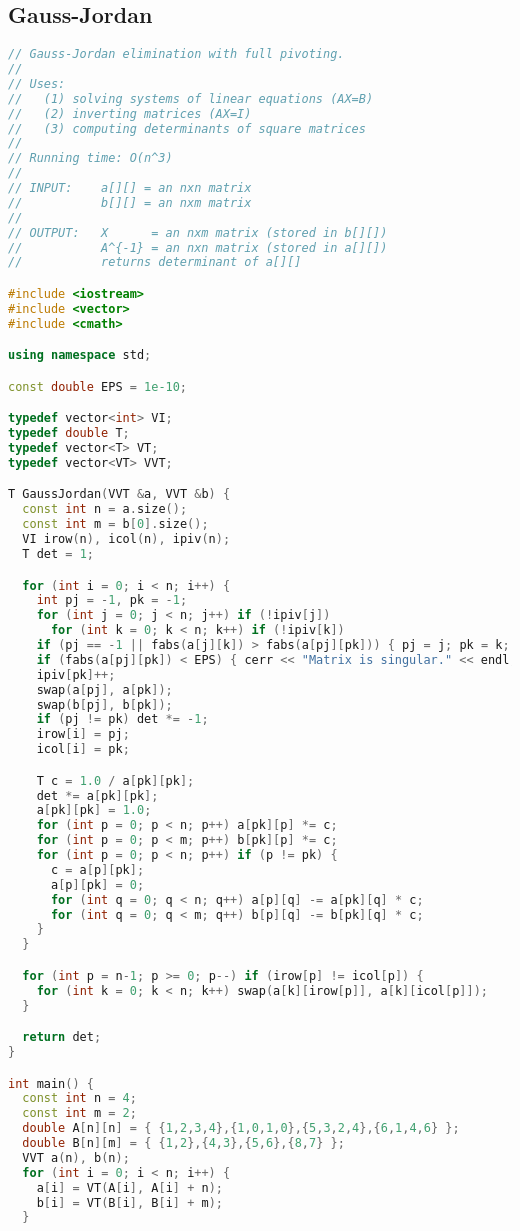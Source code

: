 \subsection{Gauss-Jordan}
\begin{lstlisting}[language=C++]
// Gauss-Jordan elimination with full pivoting.
//
// Uses:
//   (1) solving systems of linear equations (AX=B)
//   (2) inverting matrices (AX=I)
//   (3) computing determinants of square matrices
//
// Running time: O(n^3)
//
// INPUT:    a[][] = an nxn matrix
//           b[][] = an nxm matrix
//
// OUTPUT:   X      = an nxm matrix (stored in b[][])
//           A^{-1} = an nxn matrix (stored in a[][])
//           returns determinant of a[][]

#include <iostream>
#include <vector>
#include <cmath>

using namespace std;

const double EPS = 1e-10;

typedef vector<int> VI;
typedef double T;
typedef vector<T> VT;
typedef vector<VT> VVT;

T GaussJordan(VVT &a, VVT &b) {
  const int n = a.size();
  const int m = b[0].size();
  VI irow(n), icol(n), ipiv(n);
  T det = 1;

  for (int i = 0; i < n; i++) {
    int pj = -1, pk = -1;
    for (int j = 0; j < n; j++) if (!ipiv[j])
      for (int k = 0; k < n; k++) if (!ipiv[k])
	if (pj == -1 || fabs(a[j][k]) > fabs(a[pj][pk])) { pj = j; pk = k; }
    if (fabs(a[pj][pk]) < EPS) { cerr << "Matrix is singular." << endl; exit(0); }
    ipiv[pk]++;
    swap(a[pj], a[pk]);
    swap(b[pj], b[pk]);
    if (pj != pk) det *= -1;
    irow[i] = pj;
    icol[i] = pk;

    T c = 1.0 / a[pk][pk];
    det *= a[pk][pk];
    a[pk][pk] = 1.0;
    for (int p = 0; p < n; p++) a[pk][p] *= c;
    for (int p = 0; p < m; p++) b[pk][p] *= c;
    for (int p = 0; p < n; p++) if (p != pk) {
      c = a[p][pk];
      a[p][pk] = 0;
      for (int q = 0; q < n; q++) a[p][q] -= a[pk][q] * c;
      for (int q = 0; q < m; q++) b[p][q] -= b[pk][q] * c;      
    }
  }

  for (int p = n-1; p >= 0; p--) if (irow[p] != icol[p]) {
    for (int k = 0; k < n; k++) swap(a[k][irow[p]], a[k][icol[p]]);
  }

  return det;
}

int main() {
  const int n = 4;
  const int m = 2;
  double A[n][n] = { {1,2,3,4},{1,0,1,0},{5,3,2,4},{6,1,4,6} };
  double B[n][m] = { {1,2},{4,3},{5,6},{8,7} };
  VVT a(n), b(n);
  for (int i = 0; i < n; i++) {
    a[i] = VT(A[i], A[i] + n);
    b[i] = VT(B[i], B[i] + m);
  }
  

\end{lstlisting}
